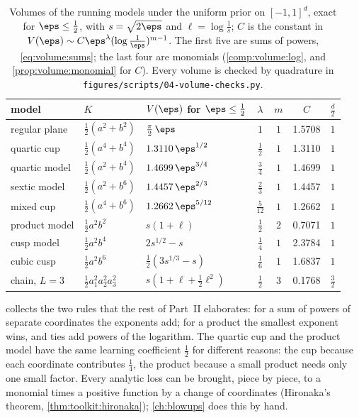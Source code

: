 \begin{refsection}
\begin{table}[t]
\centering\small
\begin{tabular}{@{}lllccS[table-format=1.4]c@{}}
\toprule
model & $K$ & $V(\eps)$ for $\eps\le\frac12$ & $\lambda$ & $m$ & {$C$} & $\frac d2$\\
\midrule
regular plane & $\frac12(a^2+b^2)$ & $\frac\pi2\,\eps$ & $1$ & $1$ & 1.5708 & $1$\\
quartic cup & $\frac12(a^4+b^4)$ & $1.3110\,\eps^{1/2}$ & $\frac12$ & $1$ & 1.3110 & $1$\\
quartic model & $\frac12(a^2+b^4)$ & $1.4699\,\eps^{3/4}$ & $\frac34$ & $1$ & 1.4699 & $1$\\
sextic model & $\frac12(a^2+b^6)$ & $1.4457\,\eps^{2/3}$ & $\frac23$ & $1$ & 1.4457 & $1$\\
mixed cup & $\frac12(a^4+b^6)$ & $1.2662\,\eps^{5/12}$ & $\frac5{12}$ & $1$ & 1.2662 & $1$\\
\addlinespace
product model & $\frac12a^2b^2$ & $s(1+\ell)$ & $\frac12$ & $2$ & 0.7071 & $1$\\
cusp model & $\frac12a^2b^4$ & $2s^{1/2}-s$ & $\frac14$ & $1$ & 2.3784 & $1$\\
cubic cusp & $\frac12a^2b^6$ & $\frac12(3s^{1/3}-s)$ & $\frac16$ & $1$ & 1.6837 & $1$\\
chain, $L=3$ & $\frac12a_1^2a_2^2a_3^2$ & $s(1+\ell+\frac12\ell^2)$ & $\frac12$ & $3$ & 0.1768 & $\frac32$\\
\bottomrule
\end{tabular}
\caption{Volumes of the running models under the uniform prior on $[-1,1]^d$, exact for $\eps\le\frac12$, with $s=\sqrt{2\eps}$ and $\ell=\log\frac1s$; $C$ is the constant in $V(\eps)\sim C\eps^\lambda(\log\frac1\eps)^{m-1}$. The first five are sums of powers, \eqref{eq:volume:sums}; the last four are monomials (\cref{comp:volume:log}, and \cref{prop:volume:monomial} for $C$). Every volume is checked by quadrature in \texttt{figures/scripts/04-volume-checks.py}.}\label{tab:volume:running}
\end{table}

 collects the two rules that the rest of Part~II elaborates: for a sum of powers of separate coordinates the exponents add; for a product the smallest exponent wins, and ties add powers of the logarithm. The quartic cup and the product model have the same learning coefficient $\frac12$ for different reasons: the cup because each coordinate contributes $\frac14$, the product because a small product needs only one small factor. Every analytic loss can be brought, piece by piece, to a monomial times a positive function by a change of coordinates (Hironaka's theorem, \cref{thm:toolkit:hironaka}); \cref{ch:blowups} does this by hand.


\end{refsection}
